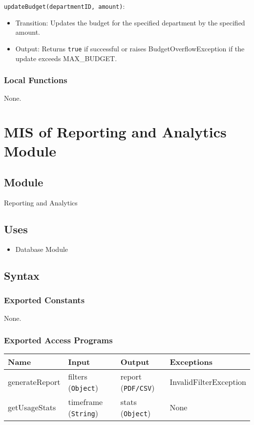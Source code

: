 \documentclass[12pt, titlepage]{article}
\begin{document}
\noindent \texttt{updateBudget(departmentID, amount)}:
\begin{itemize}
    \item Transition: Updates the budget for the specified department by the specified amount.
    \item Output: Returns \texttt{true} if successful or raises BudgetOverflowException if the update exceeds MAX\_BUDGET.
\end{itemize}

\subsubsection{Local Functions}
None.

\section{MIS of Reporting and Analytics Module}

\subsection{Module}
Reporting and Analytics

\subsection{Uses}
\begin{itemize}
    \item Database Module
\end{itemize}

\subsection{Syntax}
\subsubsection{Exported Constants}
None.

\subsubsection{Exported Access Programs}
\begin{center}
    \begin{tabular}{p{2cm} p{4cm} p{4cm} p{2cm}}
        \hline
        \textbf{Name} & \textbf{Input} & \textbf{Output} & \textbf{Exceptions} \\
        \hline
        generateReport & filters (\texttt{Object}) & report (\texttt{PDF/CSV}) & InvalidFilterException \\
        getUsageStats & timeframe (\texttt{String}) & stats (\texttt{Object}) & None \\
        \hline
    \end{tabular}
\end{center}
\end{document}
